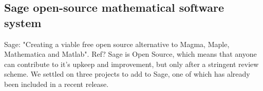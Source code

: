 \documentclass[a0,landscape]{a0poster}
\begin{document}
\vspace{1cm}
\begin{multicols}{3}




\color{Brown}
\section*{Sage open-source mathematical software system}
Sage: "Creating a viable free open source alternative to Magma, Maple, Mathematica and Matlab".
Ref?
Sage is Open Source, which means that anyone can contribute to it's upkeep and improvement, but only after a stringent review scheme.
We settled on three projects to add to Sage, one of which has already been included in a recent release.


\end{multicols}
\end{document}
